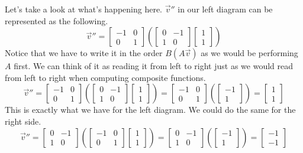 \documentclass[../main.tex]{subfiles}
\begin{document}
Let's take a look at what's happening here. $\vec{v}''$ in our
left diagram can be represented as the following.
\[
\vec{v}'' =
\begin{bmatrix}
    -1 & 0 \\
    0  & 1
\end{bmatrix}
\left(
\begin{bmatrix}
    0 & -1 \\
    1 & 0
\end{bmatrix}
\begin{bmatrix}
    1 \\
    1
\end{bmatrix}
\right)
\]
Notice that we have to write it in the order $B(A\vec{v})$ as we
would be performing $A$ first. We can think of it as reading it from
left to right just as we would read from left to right when
computing composite functions.
\[
\vec{v}'' =
\begin{bmatrix}
    -1 & 0 \\
    0  & 1
\end{bmatrix}
\left(
\begin{bmatrix}
    0 & -1 \\
    1 & 0
\end{bmatrix}
\begin{bmatrix}
    1 \\
    1
\end{bmatrix}
\right)
=
\begin{bmatrix}
    -1 & 0 \\
    0  & 1
\end{bmatrix}
\left(
\begin{bmatrix}
    -1 \\
    1
\end{bmatrix}
\right)
=
\begin{bmatrix}
    1 \\
    1
\end{bmatrix}
\]
This is exactly what we have for the left diagram. We could do
the same for the right side.
\[
\vec{v}'' =
\begin{bmatrix}
    0 & -1 \\
    1 & 0
\end{bmatrix}
\left(
\begin{bmatrix}
    -1 & 0 \\
    0  & 1
\end{bmatrix}
\begin{bmatrix}
    1 \\
    1
\end{bmatrix}
\right)
=
\begin{bmatrix}
    0 & -1 \\
    1 & 0
\end{bmatrix}
\left(
\begin{bmatrix}
    -1 \\
    1
\end{bmatrix}
\right)
=
\begin{bmatrix}
    -1 \\
    -1
\end{bmatrix}
\]
\end{document}

